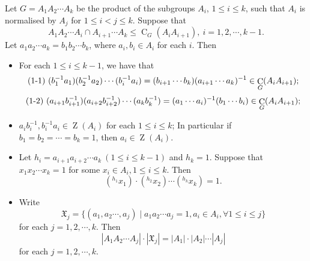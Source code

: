 \documentclass[10pt,a4paper]{amsart}
\DeclareMathOperator{\C}{C}
\DeclareMathOperator{\Z}{Z}
\newcommand\XX{\mathfrak{X}}
\begin{document}
\begin{lemma}\label{lem-elements}
Let $G=A_1A_2\cdots A_k$ be the product of the subgroups $A_i$,  $1 \leq i \leq k$, such that $A_i$ is normalised by $A_j$ for $1\leq i<j \leq k$. Suppose that
$$A_1A_2 \cdots A_i \cap A_{i+1}\cdots A_k \leq \C_G(A_iA_{i+1}),~i=1,2,\cdots,k-1.$$
Let $a_1a_2\cdots a_k=b_1b_2\cdots b_k$, where $a_i,b_i \in A_i$ for each $i$. Then
\begin{itemize}
\item[\emph{(1)}] For each $1\leq i \leq k-1$, we have that
$$\emph{\text{(1-1)}}~(b_1^{-1}a_1)(b_2^{-1}a_2)\cdots (b_i^{-1}a_i)=(b_{i+1}\cdots b_k)(a_{i+1}\cdots a_k)^{-1} \in \C_G(A_iA_{i+1});$$
$$\emph{\text{(1-2)}}~(a_{i+1}b_{i+1}^{-1})(a_{i+2}b_{i+2}^{-1})\cdots (a_kb_k^{-1})=(a_{1}\cdots a_{i})^{-1} (b_{1}\cdots b_{i}) \in \C_G(A_iA_{i+1});$$
\item[\emph{(2)}] $a_ib_i^{-1}, b_i^{-1}a_i \in \Z(A_i)$ for each $1 \leq i \leq k$; In particular if $b_1=b_2=\cdots=b_k=1$, then $a_i \in \Z(A_i).$
\item[\emph{(3)}] Let $h_i=a_{i+1}a_{i+2} \cdots a_{k}~(1\leq i \leq k-1)$ and $h_k=1$. Suppose that
$x_1x_2 \cdots x_k=1$ for some $x_i \in A_i, 1\leq i \leq k$. Then
$$({}^{h_1}x_1)\cdot ({}^{h_2}x_2) \cdots ({}^{h_k}x_k)=1. $$
\item[\emph{(4)}] Write $$\XX_j=\{(a_1,a_2 \cdots, a_j) \mid a_1a_2\cdots a_j=1, a_i \in A_i, \forall 1 \leq i \leq j\}$$
    for each $j=1,2,\cdots,k$. Then
    $$|A_1A_2\cdots A_j| \cdot |\XX_j|=|A_1|\cdot |A_2| \cdots |A_j|$$
for each $j=1,2,\cdots,k.$
\end{itemize}
\end{lemma}
\end{document}
